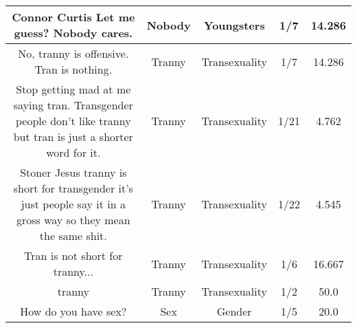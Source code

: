 \documentclass[11pt]{article}
\newlength\mylength
\begin{document}
\begin{center}
\begin{longtable}{|C{.40\mylength}|C{.30\mylength}|C{.15\mylength}|C{.15\mylength}|C{.15\mylength}|}
   Connor Curtis Let me guess? Nobody cares.  & Nobody & Youngsters & 1/7 & 14.286 \\  \hline
  No, tranny is offensive. Tran is nothing.  & Tranny & Transexuality & 1/7 & 14.286 \\  \hline
  Stop getting mad at me saying tran. Transgender people don't like tranny but tran is just a shorter word for it.  & Tranny & Transexuality & 1/21 & 4.762 \\  \hline
   Stoner Jesus tranny is short for transgender it's just people say it in a gross way so they mean the same shit.  & Tranny & Transexuality & 1/22 & 4.545 \\  \hline
  Tran is not short for tranny...  & Tranny & Transexuality & 1/6 & 16.667 \\  \hline
  tranny     & Tranny & Transexuality & 1/2 & 50.0 \\  \hline
  How do you have sex?  & Sex & Gender & 1/5 & 20.0 \\  \hline

\end{longtable}
\end{center}
\end{document}
